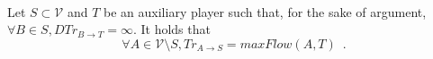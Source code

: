 {}
\begin{theorem} \ \\
  \label{trustmany}
  Let $S \subset \mathcal{V}$ and $T$ be an auxiliary player such that, for the sake of argument, $\forall B \in S, DTr_{B
  \rightarrow T} = \infty$. It holds that
  \begin{equation*}
    \forall A \in \mathcal{V} \setminus S, Tr_{A \rightarrow S} = maxFlow\left(A, T\right) \enspace.
  \end{equation*}
\end{theorem}

